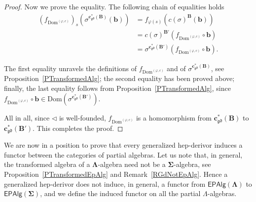 \documentclass[a4paper, reqno]{amsbook}
\newcommand{\sig}[1]{\mathbf{#1}}             %
\newcommand{\Dom}{\mathrm{Dom}}
\newcommand{\gd}{\mathfrak{gd}}              %
\theoremstyle{plain}
\theoremstyle{definition}
\begin{document}
\begin{proof}
Now we prove the equality.
The following chain of equalities holds
\begin{align*}
(f_{\Dom^{(\varphi,c)}})_{s}\left(\sigma^{\mathbf{c}^{\ast}_{\gd}(\mathbf{B})}\left(\mathbf{b}\right)\right)
&=
f_{\varphi(s)}\left(c(\sigma)^{\mathbf{B}}\left(\mathbf{b}\right)\right)
\tag{1}
\\&=
c(\sigma)^{\mathbf{B}'}\left(f_{\Dom^{(\varphi,c)}}\circ\mathbf{b}\right)
\tag{2}
\\&=
\sigma^{\mathbf{c}^{\ast}_{\gd}(\mathbf{B}')}\left(f_{\Dom^{(\varphi,c)}}\circ\mathbf{b}\right).
\tag{3}
\end{align*}

The first equality unravels the definitions of $f_{\Dom^{(\varphi,c)}}$ and of $\sigma^{\mathbf{c}^{\ast}_{\gd}(\mathbf{B})}$, see Proposition~\ref{PTransformedAlg}; the second equality has been proved above; finally, the last equality follows from Proposition~\ref{PTransformedAlg}, since $f_{\Dom^{(\varphi,c)}}\circ\mathbf{b}\in\Dom(\sigma^{\mathbf{c}^{\ast}_{\gd}(\mathbf{B}')})$.

All in all, since $\lhd$ is well-founded, $f_{\Dom^{(\varphi,c)}}$ is a homomorphism from $\mathbf{c}^{\ast}_{\gd}(\mathbf{B})$ to $\mathbf{c}^{\ast}_{\gd}(\mathbf{B}')$. This completes the proof.
\end{proof}

We are now in a position to prove that every generalized hep-derivor induces a functor between the categories of partial algebras.
Let us note that, in general, the transformed algebra of a $\sig{\Lambda}$-algebra need not be a $\sig{\Sigma}$-algebra, see Proposition~\ref{PTransformedEpAlg} and Remark~\ref{RGdNotEpAlg}.
Hence a generalized hep-derivor does not induce, in general, a functor from $\mathsf{EPAlg}(\sig{\Lambda})$ to $\mathsf{EPAlg}(\sig{\Sigma})$, and we define the induced functor on all the partial $\Lambda$-algebras.
\end{document}
